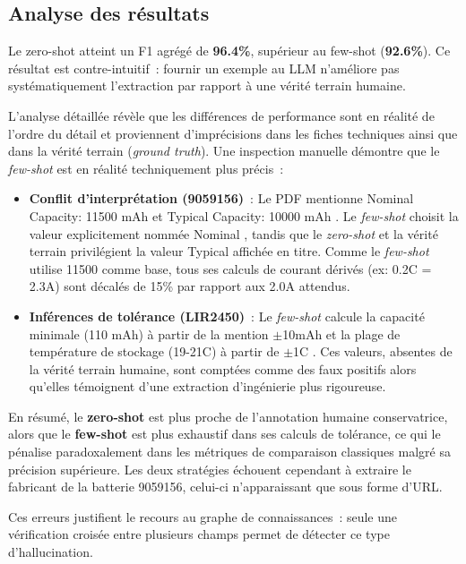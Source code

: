 \documentclass[12pt,a4paper]{article}
\begin{document}
\subsection{Analyse des r\'esultats}

Le zero-shot atteint un F1 agr\'eg\'e de \textbf{96.4\%}, sup\'erieur au few-shot (\textbf{92.6\%}). Ce r\'esultat est contre-intuitif~: fournir un exemple au LLM n'am\'eliore pas syst\'ematiquement l'extraction par rapport \`a une v\'erit\'e terrain humaine.

L'analyse d\'etaill\'ee r\'ev\`ele que les diff\'erences de performance sont en r\'ealit\'e de l'ordre du d\'etail et proviennent d'impr\'ecisions dans les fiches techniques ainsi que dans la v\'erit\'e terrain (\textit{ground truth}). Une inspection manuelle d\'emontre que le \textit{few-shot} est en r\'ealit\'e techniquement plus pr\'ecis~:
\begin{itemize}[noitemsep]
    \item \textbf{Conflit d'interpr\'etation (9059156)}~: Le PDF mentionne \og Nominal Capacity: 11500 mAh \fg{} et \og Typical Capacity: 10000 mAh \fg{}. Le \textit{few-shot} choisit la valeur explicitement nomm\'ee \og Nominal \fg{}, tandis que le \textit{zero-shot} et la v\'erit\'e terrain privil\'egient la valeur \og Typical \fg{} affich\'ee en titre. Comme le \textit{few-shot} utilise 11500 comme base, tous ses calculs de courant d\'eriv\'es (ex: 0.2C = 2.3A) sont d\'ecal\'es de 15\% par rapport aux 2.0A attendus.
    \item \textbf{Inf\'erences de tol\'erance (LIR2450)}~: Le \textit{few-shot} calcule la capacit\'e minimale (110 mAh) \`a partir de la mention $\pm$10mAh \fg{} et la plage de temp\'erature de stockage (19-21\textdegree C) \`a partir de $\pm$1\textdegree C \fg{}. Ces valeurs, absentes de la v\'erit\'e terrain humaine, sont compt\'ees comme des faux positifs alors qu'elles t\'emoignent d'une extraction d'ing\'enierie plus rigoureuse.
\end{itemize}

En r\'esum\'e, le \textbf{zero-shot} est plus proche de l'annotation humaine conservatrice, alors que le \textbf{few-shot} est plus exhaustif dans ses calculs de tol\'erance, ce qui le p\'enalise paradoxalement dans les m\'etriques de comparaison classiques malgr\'e sa pr\'ecision sup\'erieure. Les deux strat\'egies \'echouent cependant \`a extraire le fabricant de la batterie 9059156, celui-ci n'apparaissant que sous forme d'URL.

Ces erreurs justifient le recours au graphe de connaissances~: seule une v\'erification crois\'ee entre plusieurs champs permet de d\'etecter ce type d'hallucination.
\end{document}
